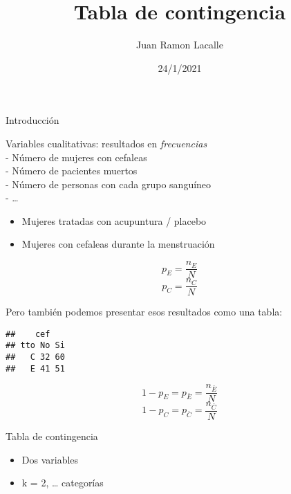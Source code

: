 \documentclass[ignorenonframetext,]{beamer}
\title{Tabla de contingencia}
\author{Juan Ramon Lacalle}
\date{24/1/2021}
\providecommand{\tightlist}{%
  \setlength{\itemsep}{0pt}\setlength{\parskip}{0pt}}
\begin{document}
\frame{\titlepage}

\begin{frame}{Introducción}
\protect\hypertarget{introducciuxf3n}{}

Variables cualitativas: resultados en \emph{frecuencias}\\
- Número de mujeres con cefaleas\\
- Número de pacientes muertos\\
- Número de personas con cada grupo sanguíneo\\
- \ldots{}

\end{frame}

\begin{frame}

\begin{itemize}
\tightlist
\item
  Mujeres tratadas con acupuntura / placebo\\
\item
  Mujeres con cefaleas durante la menstruación
\end{itemize}

\end{frame}

\begin{frame}

\[ p_{E} = \frac {n_E}{N} \] \[ p_{C} = \frac {n_C}{N} \]

\end{frame}

\begin{frame}[fragile]

Pero también podemos presentar esos resultados como una tabla:

\begin{verbatim}
##    cef
## tto No Si
##   C 32 60
##   E 41 51
\end{verbatim}

\end{frame}

\begin{frame}

\[1-p_E = p_{\bar E} = \frac {n_\bar{E}}{N} \]
\[1-p_C = p_{\bar C} = \frac {n_\bar{C}}{N} \]

\end{frame}

\begin{frame}{Tabla de contingencia}
\protect\hypertarget{tabla-de-contingencia}{}

\begin{itemize}
\tightlist
\item
  Dos variables\\
\item
  k = 2, \ldots{} categorías
\end{itemize}

\end{frame}
\end{document}
